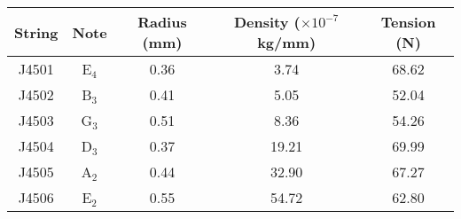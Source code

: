 \begin{tabular}{ccccc}
\toprule
String &     Note &  Radius (mm) &  Density ($\times 10^{-7}$ kg/mm) &  Tension (N) \\
\midrule
 J4501 &  E$_{4}$ &         0.36 &                              3.74 &        68.62 \\
 J4502 &  B$_{3}$ &         0.41 &                              5.05 &        52.04 \\
 J4503 &  G$_{3}$ &         0.51 &                              8.36 &        54.26 \\
 J4504 &  D$_{3}$ &         0.37 &                             19.21 &        69.99 \\
 J4505 &  A$_{2}$ &         0.44 &                             32.90 &        67.27 \\
 J4506 &  E$_{2}$ &         0.55 &                             54.72 &        62.80 \\
\bottomrule
\end{tabular}

